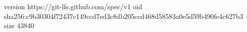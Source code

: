 version https://git-lfs.github.com/spec/v1
oid sha256:c9b30304f72437c149ccd7ed3c8db205ccd468d58583a0e5d59b490fe4c627b3
size 43840
